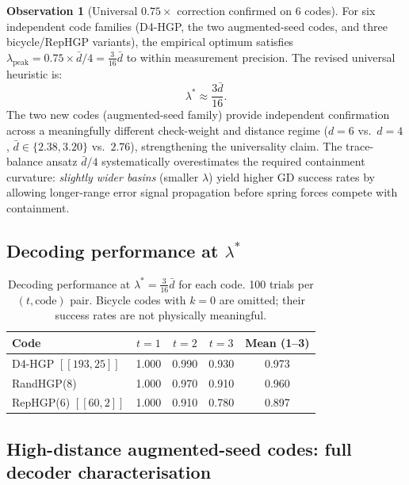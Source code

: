 \documentclass[12pt,a4paper]{article}
\theoremstyle{plain}
\theoremstyle{definition}
\newtheorem{observation}[theorem]{Observation}
\theoremstyle{remark}
\begin{document}
\begin{observation}[Universal $0.75\times$ correction confirmed on 6 codes]\label{obs:correction}
For six independent code families (D4-HGP, the two augmented-seed codes,
and three bicycle/RepHGP variants), the empirical optimum satisfies
$\lambda_{\mathrm{peak}} = 0.75 \times \bar{d}/4 = \tfrac{3}{16}\bar{d}$
to within measurement precision.
The revised universal heuristic is:
\begin{equation}
  \lambda^* \approx \frac{3\bar{d}}{16}.
  \label{eq:lambda_star}
\end{equation}
The two new codes (augmented-seed family) provide independent confirmation
across a meaningfully different check-weight and distance regime
($d=6$ vs.\ $d=4$, $\bar{d}\in\{2.38,3.20\}$ vs.\ $2.76$),
strengthening the universality claim.
The trace-balance ansatz $\bar{d}/4$ systematically overestimates the
required containment curvature: \emph{slightly wider basins} (smaller
$\lambda$) yield higher GD success rates by allowing longer-range error
signal propagation before spring forces compete with containment.
\end{observation}

\subsection{Decoding performance at $\lambda^*$}

\begin{table}[ht]
\centering
\caption{Decoding performance at $\lambda^* = \tfrac{3}{16}\bar{d}$ for
  each code.
  100 trials per $(t, \mathrm{code})$ pair.
  Bicycle codes with $k=0$ are omitted; their success rates are not
  physically meaningful.}
\label{tab:perf_zoo}
\small
\begin{tabular}{lcccc}
\toprule
Code & $t=1$ & $t=2$ & $t=3$ & Mean (1--3) \\
\midrule
D4-HGP $[[193,25]]$ & 1.000 & 0.990 & 0.930 & 0.973 \\
RandHGP(8) & 1.000 & 0.970 & 0.910 & 0.960 \\
RepHGP(6) $[[60,2]]$ & 1.000 & 0.910 & 0.780 & 0.897 \\
\bottomrule
\end{tabular}
\end{table}

\subsection{High-distance augmented-seed codes: full decoder characterisation}
\label{sec:new_codes}
\end{document}
